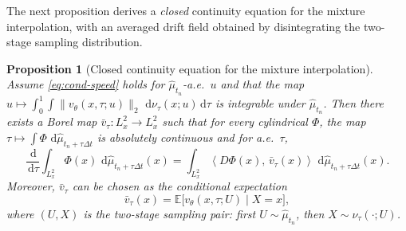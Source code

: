 \documentclass{article}
\numberwithin{equation}{section}
\theoremstyle{plain}
\newtheorem{proposition}[theorem]{Proposition}
\theoremstyle{definition}
\theoremstyle{remark}
\newcommand{\E}{\mathbb{E}}
\newcommand{\dd}{\,\mathrm{d}}
\newcommand{\ip}[2]{\left\langle #1,\,#2 \right\rangle}
\begin{document}
The next proposition derives a \emph{closed} continuity equation for the mixture interpolation, with an averaged drift
field obtained by disintegrating the two-stage sampling distribution. 

\begin{proposition}[Closed continuity equation for the mixture interpolation]\label{prop:mixture-CE}
Assume \eqref{eq:cond-speed} holds for $\widehat\mu_{t_n}$-a.e.\ $u$ and that the map
$u\mapsto \int_0^1\int\|v_\theta(x,\tau;u)\|_2\,\dd\nu_\tau(x;u)\dd\tau$ is integrable under $\widehat\mu_{t_n}$.
Then there exists a Borel map $\bar v_\tau:L^2_x\to L^2_x$ such that for every cylindrical $\Phi$,
the map $\tau\mapsto \int\Phi\,\dd\widehat\mu_{t_n+\tau\Delta t}$ is absolutely continuous and for a.e.\ $\tau$,
\begin{equation}\label{eq:mixture-CE}
\frac{\dd}{\dd\tau}\int_{L^2_x}\Phi(x)\,\dd\widehat\mu_{t_n+\tau\Delta t}(x)
=
\int_{L^2_x}\ip{D\Phi(x)}{\bar v_\tau(x)}\,\dd\widehat\mu_{t_n+\tau\Delta t}(x).
\end{equation}
Moreover, $\bar v_\tau$ can be chosen as the conditional expectation
\[
\bar v_\tau(x)=\E\big[v_\theta(x,\tau;U)\mid X=x\big],
\]
where $(U,X)$ is the two-stage sampling pair: first $U\sim\widehat\mu_{t_n}$, then $X\sim\nu_\tau(\cdot;U)$.
\end{proposition}
\end{document}

